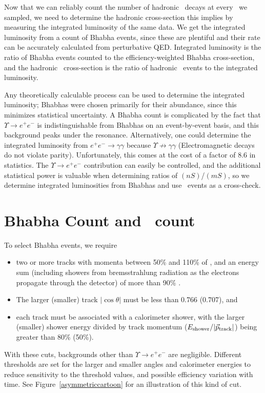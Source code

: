 \documentclass{cornell}
\begin{document}
Now that we can reliably count the number of hadronic \ups\ decays at
every \ecm\ we sampled, we need to determine the hadronic
cross-section this implies by measuring the integrated luminosity of
the same data.  We get the integrated luminosity from a count of
Bhabha events, since these are plentiful and their rate can be
accurately calculated from perturbative QED.  Integrated luminosity is
the ratio of Bhabha events counted to the efficiency-weighted Bhabha
cross-section, and the hadronic \ups\ cross-section is the ratio of
hadronic \ups\ events to the integrated luminosity.

Any theoretically calculable process can be used to determine the
integrated luminosity; Bhabhas were chosen primarily for their
abundance, since this minimizes statistical uncertainty.  A Bhabha
count is complicated by the fact that $\Upsilon \to e^+e^-$ is
indistinguishable from Bhabhas on an event-by-event basis, and this
background peaks under the resonance.  Alternatively, one could
determine the integrated luminosity from $e^+e^- \to \gamma\gamma$
because $\Upsilon \not\to \gamma\gamma$ (Electromagnetic decays do not
violate parity).  Unfortunately, this comes at the cost of a factor of
8.6 in statistics.  The $\Upsilon \to e^+e^-$ contribution
can easily be controlled, and the additional statistical power is
valuable when determining ratios of \gee$(nS)$/\gee$(mS)$, so we
determine integrated luminosities from Bhabhas and use \gamgam\ events
as a cross-check.

\section{Bhabha Count and \boldmath \gamgam\ count}

To select Bhabha events, we require
\begin{itemize}

  \item two or more tracks with momenta between 50\% and 110\% of
    \ebeam, and an energy sum (including showers from bremsstrahlung
    radiation as the electrons propagate through the detector) of more
    than 90\% \ecm.

  \item The larger (smaller) track $|\cos\theta|$ must be less than
    0.766 (0.707), and

  \item each track must be associated with a calorimeter shower, with the
    larger (smaller) shower energy divided by track momentum
    ($E_{\mbox{\scriptsize shower}}/|\vec{p}_{\mbox{\scriptsize track}}|$) being greater than 80\%
    (50\%).

\end{itemize}
With these cuts, backgrounds other than $\Upsilon \to e^+e^-$ are
negligible.  Different thresholds are set for the larger and smaller
angles and calorimeter energies to reduce sensitivity to the threshold
values, and possible efficiency variation with time.  See Figure~\ref{asymmetriccartoon} for an illustration of this kind of cut.
\end{document}
